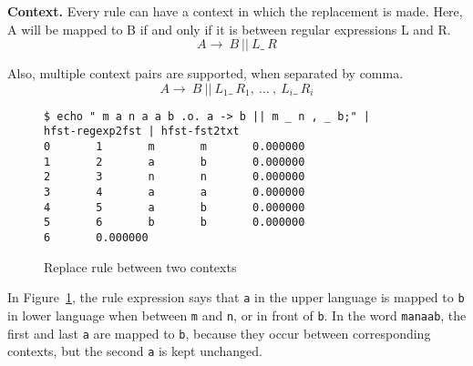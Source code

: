 \documentclass{llncs}
\begin{document}



\textbf{Context.} Every rule can have a context in which the replacement is made. 
Here, A will be mapped to B if and only if it is between regular expressions
L and R.
\begin{equation}
  A \rightarrow\ B\ ||\ L \_\  R
\end{equation}

Also, multiple context pairs are supported, when separated by comma.
\begin{equation}
  A \rightarrow\ B\ ||\ L_1 \_\  R_1 ,\ \ldots\ ,\ L_i \_\  R_i
\end{equation}

\begin{figure} [h!]
{\footnotesize
\begin{verbatim}
$ echo " m a n a a b .o. a -> b || m _ n , _ b;" |
hfst-regexp2fst | hfst-fst2txt
0       1       m       m       0.000000
1       2       a       b       0.000000
2       3       n       n       0.000000
3       4       a       a       0.000000
4       5       a       b       0.000000
5       6       b       b       0.000000
6       0.000000
\end{verbatim}
}
\caption{Replace rule between two contexts}
\label{fig:multiple_contexts}
\end{figure}

In Figure~\ref{fig:multiple_contexts}, the rule expression says that \verb!a! in the 
upper language is mapped to \verb!b! in lower language 
when between \verb!m! and \verb!n!, or in front of \verb!b!. 
In the word \verb!manaab!, the first and last \verb!a! are mapped to \verb!b!, 
because they occur between corresponding contexts, but the second \verb!a! is kept unchanged.
\end{document}
